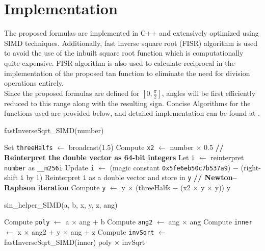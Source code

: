 \documentclass[12pt,twoside, letterpaper, margin=1in]{article}
\begin{document}
\section{Implementation}
The proposed formulas are implemented in C++ and extensively optimized using SIMD techniques. Additionally, fast inverse square root (FISR)\cite{fisr} algorithm is used to avoid the use of the inbuilt square root function which is computationally quite expensive. FISR algorithm is also used to calculate reciprocal in the implementation of the proposed tan function to eliminate the need for division operations entirely.\\
Since the proposed formulas are defined for $[0, \frac{\pi}{2}]$, angles will be first efficiently reduced to this range along with the resulting sign. Concise Algorithms for the functions used are provided below, and detailed implementation can be found at \cite{gitcode}.\\

\begin{algorithm}[H]
\caption{fastInverseSqrt\_SIMD(number)}
%
Set \texttt{threeHalfs} $\gets$ broadcast(1.5)\;
Compute \texttt{x2} $\gets$ number $\times$ 0.5\;
%
\textbf{// Reinterpret the double vector as 64-bit integers}\;
Let \texttt{i} $\gets$ reinterpret \texttt{number} as \texttt{\_\_m256i}\;
Update \texttt{i} $\gets$ (magic constant \texttt{0x5fe6eb50c7b537a9}) $-$ (right-shift \texttt{i} by 1)\;
Reinterpret \texttt{i} as a double vector and store in \texttt{y}\;
%
\textbf{// Newton–Raphson iteration}\;
Compute \texttt{y} $\gets$ y $\times$ (threeHalfs $-$ (x2 $\times$ y $\times$ y))\;
%
\Return y\;
\end{algorithm}

\begin{algorithm}[H]
\caption{sin\_helper\_SIMD(a, b, x, y, z, ang)}
%
Compute \texttt{poly} $\gets$ a $\times$ ang $+$ b\;
Compute \texttt{ang2} $\gets$ ang $\times$ ang\;
Compute \texttt{inner} $\gets$ x $\times$ ang2 $+$ y $\times$ ang $+$ z\;
Compute \texttt{invSqrt} $\gets$ fastInverseSqrt\_SIMD(inner)\;
%
\Return poly $\times$ invSqrt\;
\end{algorithm}
\end{document}
